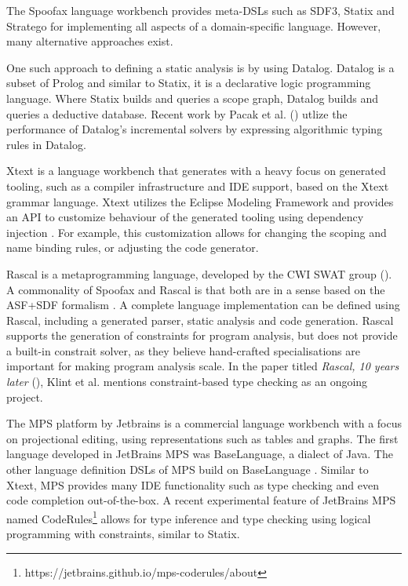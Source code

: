     The Spoofax language workbench provides meta-DSLs such as SDF3, Statix and Stratego for implementing all aspects of a domain-specific language. However, many alternative approaches exist.

    One such approach to defining a static analysis is by using Datalog. Datalog is a subset of Prolog and similar to Statix, it is a declarative logic programming language. Where Statix builds and queries a scope graph, Datalog builds and queries a deductive database. Recent work by Pacak et al. (\citeyear{PacakES20}) utlize the performance of Datalog's incremental solvers by expressing algorithmic typing rules in Datalog.

    Xtext \autocite{EfftingeVoelter2006} is a language workbench that generates with a heavy focus on generated tooling, such as a compiler infrastructure and IDE support, based on the Xtext grammar language. Xtext utilizes the Eclipse Modeling Framework \autocite{Steinberg2009EMF} and provides an API to customize behaviour of the generated tooling using dependency injection \autocite{eysholdt2010xtext}. For example, this customization allows for changing the scoping and name binding rules, or adjusting the code generator.

    Rascal is a metaprogramming language, developed by the CWI SWAT group (\citeyear{KlintSV09}). A commonality of Spoofax and Rascal is that both are in a sense based on the ASF+SDF formalism \autocite{Klint93}. A complete language implementation can be defined using Rascal, including a generated parser, static analysis and code generation. Rascal supports the generation of constraints for program analysis, but does not provide a built-in constrait solver, as they believe hand-crafted specialisations are important for making program analysis scale. In the paper titled \textit{Rascal, 10 years later} (\citeyear{KlintSV19}), Klint et al. mentions constraint-based type checking as an ongoing project.

    The MPS platform by Jetbrains \autocite{Dmitriev2004LanguageOP} is a commercial language workbench with a focus on projectional editing, using representations such as tables and graphs. The first language developed in JetBrains MPS was BaseLanguage, a dialect of Java. The other language definition DSLs of MPS build on BaseLanguage \autocite{PechSV13}. Similar to Xtext, MPS provides many IDE functionality such as type checking and even code completion out-of-the-box. A recent experimental feature of JetBrains MPS named CodeRules\footnote{https://jetbrains.github.io/mps-coderules/about} allows for type inference and type checking using logical programming with constraints, similar to Statix.
